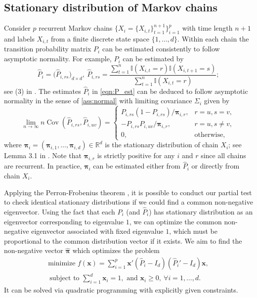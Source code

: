 \documentclass[12pt]{article}
\numberwithin{thm}{section}
\numberwithin{defn}{section}
\numberwithin{lem}{section}
\numberwithin{prop}{section}
\numberwithin{cor}{section}
\numberwithin{rem}{section}
\DeclareMathOperator{\cov}{Cov}
\begin{document}
\vspace{-0.5cm}
\subsection{Stationary distribution of Markov chains}\label{se:Markov}
\vspace{-0.3cm}
Consider $p$ recurrent Markov chains $\{X_i = \{X_{i,t}\}_{t = 1}^{n+1} \}_{i = 1}^p$ with time length $n+1$ and labels $X_{i,t}$ from a finite discrete state space $\{1, \dots, d\}$. Within each chain the transition probability matrix $P_i$ can be estimated consistently to follow asymptotic normality. %
For example, $P_i$ can be estimated by
\begin{equation}
    \widehat{P}_i = \big(\widehat{P}_{i,rs}\big)_{d \times d}, ~ \widehat{P}_{i,rs} = \frac{\sum_{t=1}^{n} \mathbb{I}(X_{i,t} = r) \mathbb{I}(X_{i,t+1} = s)}{\sum_{t = 1}^{n} \mathbb{I}(X_{i,t} = r)};\label{eqn:P_est}
\end{equation}
see (3) in \cite{barsotti}.
The estimates $\widehat{P}_i$ in \eqref{eqn:P_est} can be deduced to follow asymptotic normality in the sense of \autoref{ass:normal} with limiting covariance $\Sigma_i$ given by
\begin{equation}
\lim_{n \to \infty} n \cov(\widehat{P}_{i,rs}, \widehat{P}_{i,uv}) = 
\begin{cases}
P_{i,rs} (1 - P_{i,rs})/\bm{\pi}_{i,r}, & r = u, s = v,
\\
-P_{i,rs} P_{i,uv}/\bm{\pi}_{i,r}, & r = u, s \neq v,
\\
0, & \mbox{otherwise,}
\end{cases} \label{eqn:covMarkov}
\end{equation}
where $\bm{\pi}_i = (\bm{\pi}_{i,1}, \dots, \bm{\pi}_{i,d}) \in \mathbb{R}^d$ is the stationary distribution of chain $X_i$; see Lemma 3.1 in \cite{barsotti}. Note that $\bm{\pi}_{i,r}$ is strictly positive for any $i$ and $r$ since all chains are recurrent. In practice, $\bm{\pi}_i$ can be estimated either from $\widehat{P}_i$ or directly from chain $X_i$.

Applying the Perron-Frobenius theorem \citep[Theorem 8.4.4]{Horn}, it is possible to conduct our partial test to check identical stationary distributions if we could find a common non-negative eigenvector. Using the fact that each $P_i$ (and $\widehat{P}_i$) has stationary distribution as an eigenvector corresponding to eigenvalue $1$, we can optimize the common non-negative eigenvector associated with fixed eigenvalue $1$, which must be proportional to the common distribution vector if it exists. We aim to find the non-negative vector $\bm{\widehat{\pi}}$ which optimizes the problem
\begin{multline}\label{eqn:minimize}
    \mbox{minimize } f(\bm{x}) = \sum_{i = 1}^p \bm{x}'(\widehat{P}_i - I_d)(\widehat{P}_i' - I_d)\bm{x},\\
    ~ \mbox{subject to } \sum_{i=1}^d \bm{x}_i = 1, \mbox{ and }\bm{x}_i \ge 0, ~ \forall i = 1, \dots, d.
\end{multline}
It can be solved via quadratic programming with explicitly given constraints.
\end{document}

